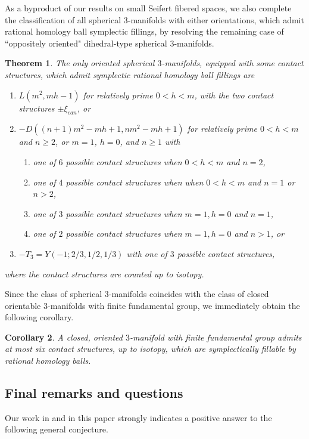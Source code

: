 \documentclass[11pt]{amsart}
\theoremstyle{plain}
\newtheorem{theorem}{Theorem}
\newtheorem{corollary}[theorem]{Corollary}
\theoremstyle{definition}
\theoremstyle{remark}
\numberwithin{theorem}{section}
\begin{document}
 As a byproduct of our results on small Seifert fibered spaces,  we also complete the classification of all spherical $3$-manifolds with either orientations,  which admit rational homology ball symplectic fillings, by resolving  
the remaining case of ``oppositely oriented" dihedral-type spherical $3$-manifolds. 
\begin{theorem}\label{classifyfillings}
The only oriented spherical $3$-manifolds, equipped with some contact structures, which admit symplectic rational homology ball fillings are
\begin{enumerate}
\item $L(m^2, mh-1)$ for relatively prime $0<h<m$, with the two contact structures $\pm \xi_{can}$, or
\item $-D((n+1)m^2-mh+1, nm^2-mh+1)$ for relatively prime $0<h<m$ and $n \geq 2$, or $m=1$, $h=0$, and $n\geq 1$ with 
\begin{enumerate}
\item one of $6$ possible contact structures when $0<h<m$ and $n=2$,
\item one of $4$ possible contact structures when when $0<h<m$ and $n=1$ or $n>2$,
\item one of $3$ possible contact structures when $m=1, h=0$ and $n=1$,
\item one of $2$ possible contact structures when $m=1, h=0$ and $n>1$, or
\end{enumerate}
\item $-T_3=Y(-1;2/3, 1/2, 1/3)$ with one of $3$ possible contact structures,
\end{enumerate} 
where the contact structures are counted up to isotopy.
\end{theorem}

Since the class of spherical $3$-manifolds coincides with the class of closed orientable $3$-manifolds with finite fundamental group, we immediately obtain the following corollary.

\begin{corollary} A closed, oriented  $3$-manifold with finite fundamental group
admits at most six contact structures, up to isotopy, which are
symplectically fillable by rational homology balls.
\end{corollary}


\subsection{Final remarks and questions} 
Our work in \cite{EtnyreOzbagciTosun2025} and in this paper strongly indicates a positive answer to the following general conjecture.
\end{document}
